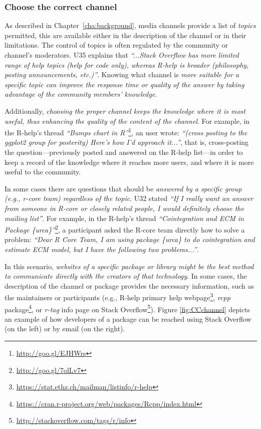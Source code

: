 \documentclass{sig-alternate-05-2015}
\begin{document}
	\subsubsection{Choose the correct channel}

		As described in Chapter~\ref{cha:background}, media channels provide a list of \textit{topics} permitted, this are available either in the description of the channel or in their limitations.
		The control of topics is often regulated by the community or channel's moderators.
		U35 explains that \textit{``...Stack Overflow has more limited range of help topics (help for code only), whereas R-help is broader (philosophy, posting announcements, etc.)''}.
		Knowing what channel is \emph{more suitable for a specific topic can improve the response time or quality of the answer by taking advantage of the community members' knowledge}.

		Additionally, \emph{choosing the proper channel keeps the knowledge where it is most useful, thus enhancing the quality of the content of the channel}.
		For example, in the R-help's thread \textit{``Bumps chart in R''}\footnote{\url{http://goo.gl/EJHWrs}}, an user wrote: \textit{``(cross posting to the ggplot2 group for posterity) Here's how I'd approach it...''}, that is, cross-posting the question---previously posted and answered on the R-help list---in order to keep a record of the knowledge where it reaches more users, and where it is more useful to the community.

		In some cases there are questions that should be \emph{answered by a \textit{specific group} (e.g., r-core team) regardless of the topic}.
		U32 stated \textit{``If I really want an answer from someone in R-core or closely related people, I would definitely choose the mailing list''}.
		For example, in the R-help's thread \textit{``Cointegration and ECM in Package \{urca\}''}\footnote{\url{http://goo.gl/7olLv7}}, a participant asked the R-core team directly how to solve a problem: \textit{``Dear R Core Team, I am using package \{urca\} to do cointegration and estimate ECM model, but I have the following two problems...''}.

		In this scenario, \emph{websites of a specific package or library might be the best method to communicate directly with the creators of that technology}.
		In some cases, the description of the channel or package provides the necessary information, such as the maintainers or participants (e.g., R-help primary help webpage\footnote{\url{https://stat.ethz.ch/mailman/listinfo/r-help}}, \emph{rcpp} package\footnote{\url{https://cran.r-project.org/web/packages/Rcpp/index.html}}, or \textit{r-tag} info page on Stack Overflow\footnote{\url{http://stackoverflow.com/tags/r/info}}).
		Figure \ref{fig:CCchannel} depicts an example of how developers of a package can be reached using Stack Overflow (on the left) or by email (on the right). 
\end{document}

